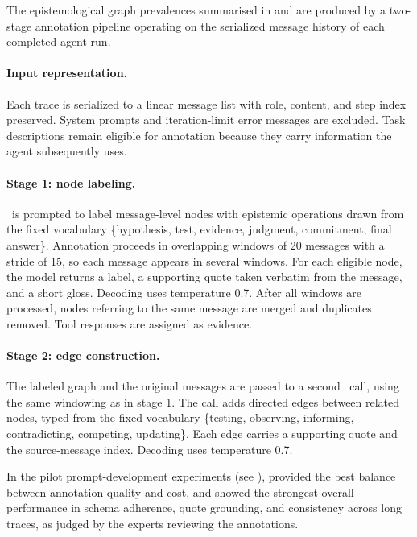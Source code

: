 The epistemological graph prevalences summarised in  and  are produced by a two-stage annotation pipeline operating on the serialized message history of each completed agent run.

\paragraph{Input representation.} Each trace is serialized to a linear message list with role, content, and step index preserved. System prompts and iteration-limit error messages are excluded. Task descriptions remain eligible for annotation because they carry information the agent subsequently uses.

\paragraph{Stage 1: node labeling.} \claudesonnet\ is prompted to label message-level nodes with epistemic operations drawn from the fixed vocabulary \{hypothesis, test, evidence, judgment, commitment, final answer\}. Annotation proceeds in overlapping windows of 20 messages with a stride of 15, so each message appears in several windows. For each eligible node, the model returns a label, a supporting quote taken verbatim from the message, and a short gloss. Decoding uses temperature 0.7. After all windows are processed, nodes referring to the same message are merged and duplicates removed. Tool responses are assigned as evidence. 

\paragraph{Stage 2: edge construction.} The labeled graph and the original messages are passed to a second \claudesonnet\ call, using the same windowing as in stage 1. The call adds directed edges between related nodes, typed from the fixed vocabulary \{testing, observing, informing, contradicting, competing, updating\}. Each edge carries a supporting quote and the source-message index. Decoding uses temperature 0.7.

In the pilot prompt-development experiments (see ), \claudesonnet provided the best balance between annotation quality and cost, and showed the strongest overall performance in schema adherence, quote grounding, and consistency across long traces, as judged by the experts reviewing the annotations.

